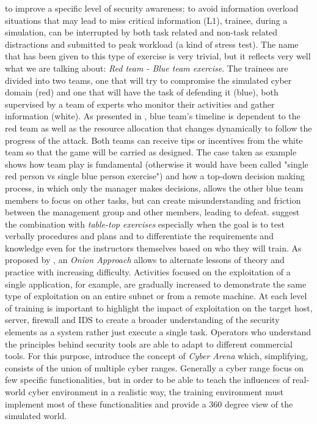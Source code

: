 to improve a specific level of security awareness: to avoid information overload situations that may lead to miss critical information (L1), trainee, during a simulation, can be interrupted by both task related and non-task related distractions and submitted to peak workload (a kind of stress test).\newline
The name that has been given to this type of exercise is very trivial, but it reflects very well what we are talking about: \textit{Red team - Blue team exercise}. The trainees are divided into two teams, one that will try to compromise the simulated cyber domain (red) and one that will have the task of defending it (blue), both supervised by a team of experts who monitor their activities and gather information (white). As presented in \cite{Aoyama2015}, blue team's timeline is dependent to the red team as well as the resource allocation that changes dynamically to follow the progress of the attack. Both teams can receive tips or incentives from the white team so that the game will be carried as designed. The case taken as example shows how team play is fundamental (otherwise it would have been called "single red person vs single blue person exercise") and how a top-down decision making process, in which only the manager makes decisions, allows the other blue team members to focus on other tasks, but can create misunderstanding and friction between the management group and other members, leading to defeat. \cite{Ostby2019} suggest the combination with \textit{table-top exercises} especially when the goal is to test verbally procedures and plans and to differentiate the requirements and knowledge even for the instructors themselves based on who they will train. As proposed by \cite{Clark2015}, an \textit{Onion Approach} allows to alternate lessons of theory and practice with increasing difficulty. Activities focused on the exploitation of a single application, for example, are gradually increased to demonstrate the same type of exploitation on an entire subnet or from a remote machine. At each level of training is important to highlight the impact of exploitation on the target host, server, firewall and IDS to create a broader understanding of the security elements as a system rather just execute a single task. Operators who understand the principles behind security tools are able to adapt to different commercial tools. For this purpose, \cite{Karjalainen2020} introduce the concept of \textit{Cyber Arena} which, simplifying, consists of the union of multiple cyber ranges. Generally a cyber range focus on few specific functionalities, but in order to be able to teach the influences of real-world cyber environment in a realistic way, the training environment must implement most of these functionalities and provide a 360 degree view of the simulated world.
